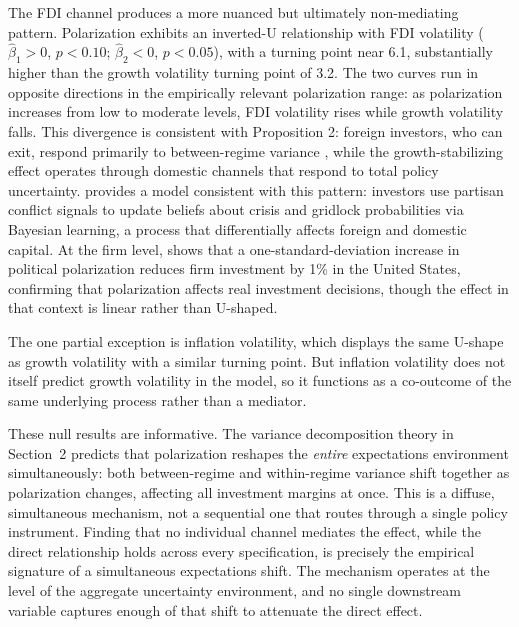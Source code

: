 \documentclass[12pt]{article}
\begin{document}
The FDI channel produces a more nuanced but ultimately non-mediating
pattern. Polarization exhibits an inverted-U relationship with FDI
volatility ($\hat{\beta}_1 > 0$, $p < 0.10$; $\hat{\beta}_2 < 0$,
$p < 0.05$), with a turning point near 6.1, substantially higher than the
growth volatility turning point of 3.2. The two curves run in opposite
directions in the empirically relevant polarization range: as polarization
increases from low to moderate levels, FDI volatility rises while growth
volatility falls. This divergence is consistent with Proposition 2: foreign
investors, who can exit, respond primarily to between-regime variance
\citep{KokashviliBarbakadze2020, Azzimonti2019}, while the
growth-stabilizing effect operates through domestic channels that respond
to total policy uncertainty. \citet{Azzimonti2021} provides a model
consistent with this pattern: investors use partisan conflict signals to
update beliefs about crisis and gridlock probabilities via Bayesian
learning, a process that differentially affects foreign and domestic
capital. At the firm level, \citet{Zhu2024} shows that a
one-standard-deviation increase in political polarization reduces firm
investment by 1\% in the United States, confirming that polarization
affects real investment decisions, though the effect in that context is
linear rather than U-shaped.

The one partial exception is inflation volatility, which displays the same
U-shape as growth volatility with a similar turning point. But inflation
volatility does not itself predict growth volatility in the model, so it
functions as a co-outcome of the same underlying process rather than
a mediator.

These null results are informative. The variance decomposition theory in
Section~2 predicts that polarization reshapes the \textit{entire}
expectations environment simultaneously: both between-regime and
within-regime variance shift together as polarization changes, affecting
all investment margins at once. This is a diffuse, simultaneous mechanism,
not a sequential one that routes through a single policy instrument. Finding
that no individual channel mediates the effect, while the direct
relationship holds across every specification, is precisely the
empirical signature of a simultaneous expectations shift. The mechanism
operates at the level of the aggregate uncertainty environment, and no
single downstream variable captures enough of that shift to attenuate
the direct effect.
\end{document}
